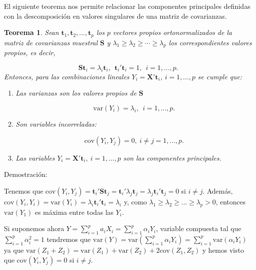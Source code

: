 \documentclass[tfg,cienciasbased,lot,lof,covers,final,overleaf,nocopyright]{tfgtfmthesisuam}
\newtheorem{teor}{Teorema}[chapter]
\begin{document}
El siguiente teorema nos permite relacionar las componentes principales definidas con la descomposición en valores singulares de una matriz de covarianzas.
\begin{teor}
    Sean $\mathbf{t}_1, \mathbf{t}_2, ..., \mathbf{t}_p$ los $p$ vectores propios ortonormalizados de la matriz de covarianzas muestral $\mathbf{S}$ y $\lambda_1 \geq \lambda_2 \geq \cdots \geq \lambda_p$ los correspondientes valores propios, es decir,
    
    \begin{equation*}
        \mathbf{S}\mathbf{t}_i = \lambda_i \mathbf{t}_i,\ \  \mathbf{t}_i'\mathbf{t}_i = 1,\ \  i = 1,...,p.
    \end{equation*}
    Entonces, para las combinaciones lineales $Y_i = \mathbf{X't}_i$, $i= 1,...,p$ se cumple que:
    \begin{enumerate}
        \item Las varianzas son los valores propios de $\mathbf{S}$
        
        \begin{equation*}
            \mbox{var}(Y_i) = \lambda_i,\ \ i= 1,...,p.
        \end{equation*}
        \item Son variables incorreladas:
        
        \begin{equation*}
            \mbox{cov}(Y_i,Y_j)=0,\ i \neq j = 1,...,p.
        \end{equation*}
        \item Las variables  $Y_i = \mathbf{X}'\mathbf{t}_i,\ i = 1,...,p$ son las componentes principales.
    \end{enumerate}
\end{teor}
Demostración:

Tenemos que $\mbox{cov}(Y_i, Y_j) = \mathbf{t}_i'\mathbf{S}\mathbf{t}_j = \mathbf{t}_i'\lambda_j\mathbf{t}_j = \lambda_j\mathbf{t}_i'\mathbf{t}_j = 0$ si $i \neq j$. Además, $\mbox{cov}(Y_i, Y_i) = \mbox{var}(Y_i) = \lambda_i\mathbf{t}_i'\mathbf{t}_i = \lambda_i$ y, como $\lambda_1 \geq \lambda_2 \geq ... \geq \lambda_p > 0$, entonces $\mbox{var}(Y_1)$ es máxima entre todas las $Y_i$.

Si suponemos ahora $Y = \sum_{i=1}^{p} a_i X_i = \sum_{i=1}^{p} \alpha_i Y_i$, variable compuesta tal que $\sum_{i=1}^{p} \alpha_i^2 = 1$ tendremos que $\mbox{var}(Y) = \mbox{var}(\sum_{i=1}^{p} \alpha_i Y_i) = \sum_{i=1}^{p} \mbox{var}(\alpha_i Y_i)$ ya que $\mbox{var}(Z_1+Z_2) = \mbox{var}(Z_1) + \mbox{var}(Z_2) + 2\mbox{cov}(Z_1, Z_2)$ y hemos visto que $\mbox{cov}(Y_i, Y_j) = 0$ si $i \neq j$.
\end{document}
